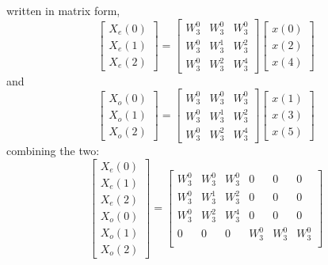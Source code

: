 \documentclass[journal,12pt,twocolumn]{IEEEtran}
\renewcommand\thesection{\arabic{section}}
\begin{document}
\begin{enumerate}[label=\thesection.\arabic*.,ref=\thesection.\theenumi]
written in matrix form, 
\begin{equation}
\begin{bmatrix}
X_{e}(0) \\ 
X_{e}(1) \\ 
X_{e}(2) 
\end{bmatrix}
=
\begin{bmatrix}
W^{0}_{3} & W^{0}_{3} & W^{0}_{3} \\
W^{0}_{3} & W^{1}_{3} & W^{2}_{3} \\
W^{0}_{3} & W^{2}_{3} & W^{4}_{3} 
\end{bmatrix}
\begin{bmatrix}
x(0) \\ 
x(2) \\ 
x(4) 
\end{bmatrix}   
\end{equation}
and 
\begin{equation}
\begin{bmatrix}
X_{o}(0) \\ 
X_{o}(1) \\ 
X_{o}(2)
\end{bmatrix}
=
\begin{bmatrix}
W^{0}_{3} & W^{0}_{3} & W^{0}_{3}\\
W^{0}_{3} & W^{1}_{3} & W^{2}_{3}\\
W^{0}_{3} & W^{2}_{3} & W^{4}_{3}
\end{bmatrix}
\begin{bmatrix}
x(1) \\ 
x(3) \\ 
x(5) 
\end{bmatrix}   
\end{equation}
combining the two:
\begin{equation}
\begin{bmatrix}
X_{e}(0) \\ 
X_{e}(1) \\ 
X_{e}(2) \\ 
X_{o}(0) \\ 
X_{o}(1) \\ 
X_{o}(2)
\end{bmatrix}
=
\begin{bmatrix}
W^{0}_{3} & W^{0}_{3} & W^{0}_{3} & 0 & 0 & 0\\
W^{0}_{3} & W^{1}_{3} & W^{2}_{3} & 0 & 0 & 0\\
W^{0}_{3} & W^{2}_{3} & W^{4}_{3} & 0 & 0 & 0\\
0 & 0 & 0 & W^{0}_{3} & W^{0}_{3} & W^{0}_{3}\\

\end{bmatrix}
\end{equation}
\end{enumerate}
\end{document}
